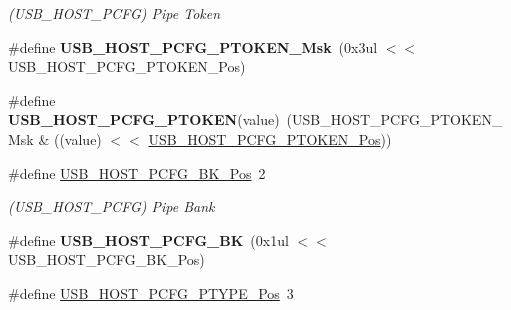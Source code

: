 \begin{DoxyCompactItemize}
\begin{DoxyCompactList}\small\item\em (U\+S\+B\+\_\+\+H\+O\+S\+T\+\_\+\+P\+C\+F\+G) Pipe Token \end{DoxyCompactList}\item 
\hypertarget{group___s_a_m_l21___u_s_b_ga36b743e1453bc3f60e4435fe8cc4e267}{}\#define {\bfseries U\+S\+B\+\_\+\+H\+O\+S\+T\+\_\+\+P\+C\+F\+G\+\_\+\+P\+T\+O\+K\+E\+N\+\_\+\+Msk}~(0x3ul $<$$<$ U\+S\+B\+\_\+\+H\+O\+S\+T\+\_\+\+P\+C\+F\+G\+\_\+\+P\+T\+O\+K\+E\+N\+\_\+\+Pos)\label{group___s_a_m_l21___u_s_b_ga36b743e1453bc3f60e4435fe8cc4e267}

\item 
\hypertarget{group___s_a_m_l21___u_s_b_ga9440fc4d7c9db7e0bef7f8da34e2be35}{}\#define {\bfseries U\+S\+B\+\_\+\+H\+O\+S\+T\+\_\+\+P\+C\+F\+G\+\_\+\+P\+T\+O\+K\+E\+N}(value)~(U\+S\+B\+\_\+\+H\+O\+S\+T\+\_\+\+P\+C\+F\+G\+\_\+\+P\+T\+O\+K\+E\+N\+\_\+\+Msk \& ((value) $<$$<$ \hyperlink{group___s_a_m_l21___u_s_b_ga7281dcd97dbe27666a291c0f02724de7}{U\+S\+B\+\_\+\+H\+O\+S\+T\+\_\+\+P\+C\+F\+G\+\_\+\+P\+T\+O\+K\+E\+N\+\_\+\+Pos}))\label{group___s_a_m_l21___u_s_b_ga9440fc4d7c9db7e0bef7f8da34e2be35}

\item 
\hypertarget{group___s_a_m_l21___u_s_b_ga9efe4994804d257e0066706f7db38ed5}{}\#define \hyperlink{group___s_a_m_l21___u_s_b_ga9efe4994804d257e0066706f7db38ed5}{U\+S\+B\+\_\+\+H\+O\+S\+T\+\_\+\+P\+C\+F\+G\+\_\+\+B\+K\+\_\+\+Pos}~2\label{group___s_a_m_l21___u_s_b_ga9efe4994804d257e0066706f7db38ed5}

\begin{DoxyCompactList}\small\item\em (U\+S\+B\+\_\+\+H\+O\+S\+T\+\_\+\+P\+C\+F\+G) Pipe Bank \end{DoxyCompactList}\item 
\hypertarget{group___s_a_m_l21___u_s_b_ga6f0adaba9ecba23372724e578d5e7fe8}{}\#define {\bfseries U\+S\+B\+\_\+\+H\+O\+S\+T\+\_\+\+P\+C\+F\+G\+\_\+\+B\+K}~(0x1ul $<$$<$ U\+S\+B\+\_\+\+H\+O\+S\+T\+\_\+\+P\+C\+F\+G\+\_\+\+B\+K\+\_\+\+Pos)\label{group___s_a_m_l21___u_s_b_ga6f0adaba9ecba23372724e578d5e7fe8}

\item 
\hypertarget{group___s_a_m_l21___u_s_b_gaa259f8f23e488d8bb4029b3b657e3d81}{}\#define \hyperlink{group___s_a_m_l21___u_s_b_gaa259f8f23e488d8bb4029b3b657e3d81}{U\+S\+B\+\_\+\+H\+O\+S\+T\+\_\+\+P\+C\+F\+G\+\_\+\+P\+T\+Y\+P\+E\+\_\+\+Pos}~3\label{group___s_a_m_l21___u_s_b_gaa259f8f23e488d8bb4029b3b657e3d81}


\end{DoxyCompactItemize}
